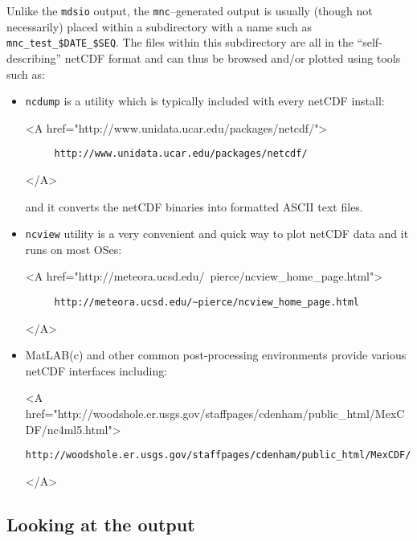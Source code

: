 Unlike the \texttt{mdsio} output, the \texttt{mnc}--generated output
is usually (though not necessarily) placed within a subdirectory with
a name such as \texttt{mnc\_test\_\${DATE}\_\${SEQ}}.  The files
within this subdirectory are all in the ``self-describing'' netCDF
format and can thus be browsed and/or plotted using tools such as:
\begin{itemize}
\item \texttt{ncdump} is a utility which is typically included
  with every netCDF install:
  \begin{rawhtml} <A href="http://www.unidata.ucar.edu/packages/netcdf/"> \end{rawhtml}
\begin{verbatim}
     http://www.unidata.ucar.edu/packages/netcdf/
\end{verbatim}
  \begin{rawhtml} </A> \end{rawhtml} and it converts the netCDF
  binaries into formatted ASCII text files.

\item \texttt{ncview} utility is a very convenient and quick way
  to plot netCDF data and it runs on most OSes:
  \begin{rawhtml} <A href="http://meteora.ucsd.edu/~pierce/ncview_home_page.html"> \end{rawhtml}
\begin{verbatim}
     http://meteora.ucsd.edu/~pierce/ncview_home_page.html
\end{verbatim}
  \begin{rawhtml} </A> \end{rawhtml}
  
\item MatLAB(c) and other common post-processing environments provide
  various netCDF interfaces including:
  \begin{rawhtml} <A href="http://woodshole.er.usgs.gov/staffpages/cdenham/public_html/MexCDF/nc4ml5.html"> \end{rawhtml}
\begin{verbatim}
http://woodshole.er.usgs.gov/staffpages/cdenham/public_html/MexCDF/nc4ml5.html
\end{verbatim}
  \begin{rawhtml} </A> \end{rawhtml}
\end{itemize}


\subsection{Looking at the output}


